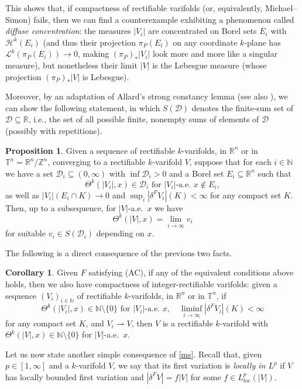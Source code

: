 \documentclass[11pt,a4paper]{amsart}
\newcommand{\N}{\mathbb{N}}
\newcommand{\Z}{\mathbb{Z}}
\newcommand{\R}{\mathbb{R}}
\newcommand{\nin}{\not\in}
\theoremstyle{definition}
\newtheorem{corollary}[definition]{Corollary}
\newtheorem{proposition}[definition]{Proposition}
\newcommand{\weakto}{\rightharpoonup}
\begin{document}
This shows that, if compactness of rectifiable varifolds (or, equivalently, Michael--Simon) fails,
then we can find a counterexample exhibiting a phenomenon called \emph{diffuse concentration}:
the measures $|V_i|$ are concentrated on Borel sets $E_i$ with $\mathcal{H}^k(E_i)$
(and thus their projection $\pi_P(E_i)$ on any coordinate $k$-plane has $\mathcal{L}^k(\pi_P(E_i))\to0$,
making $(\pi_P)_*|V_i|$ look more and more like a singular measure), but nonetheless
their limit $|V|$ is the Lebesgue measure (whose projection $(\pi_P)_*|V|$ is Lebesgue).


Moreover, by an adaptation of Allard's strong constancy lemma \cite[p.\ 3]{All.const} (see also \cite{DDG,DR}), we can show the following statement, in which $S(\mathcal{D})$ denotes the finite-sum set of $\mathcal{D}\subseteq\R$, i.e., the set of all possible finite, nonempty sums of elements of $\mathcal{D}$ (possibly with repetitions).

\begin{proposition}\label{sumset}
    Given a sequence of rectifiable $k$-varifolds, in $\R^n$ or in $\mathbb{T}^n=\R^n/\Z^n$,
    converging to a rectifiable $k$-varifold $V$, suppose that for each $i\in\N$ we have a set $\mathcal{D}_i\subseteq(0,\infty)$ with $\inf\mathcal{D}_i>0$ and a Borel set $E_i\subseteq\R^n$ such that
    $$\Theta^k(|V_i|,x)\in \mathcal{D}_i\text{ for $|V_i|$-a.e.\ $x\nin E_i$},$$
    as well as $|V_i|(E_i\cap K)\to0$ and $\sup_i|\delta^FV_i|(K)<\infty$
    for any compact set $K$. Then, up to a subsequence, for $|V|$-a.e.\ $x$ we have
    $$\Theta^k(|V|,x)=\lim_{i\to\infty}v_i$$
    for suitable $v_i\in S(\mathcal{D}_i)$ depending on $x$.
\end{proposition}

The following is a direct consequence of the previous two facts.

\begin{corollary}\label{cpt.int}
    Given $F$ satisfying (AC),
    if any of the equivalent conditions above holds, then we also have compactness of integer-rectifiable varifolds:
    given a sequence $(V_i)_{i\in\N}$ of rectifiable $k$-varifolds, in $\R^n$ or in $\mathbb{T}^n$, if
    $$\Theta^k(|V_i|,x)\in\N\setminus\{0\}\text{ for $|V_i|$-a.e.\ $x$},\quad\liminf_{i\to\infty}|\delta^FV_i|(K)<\infty$$
    for any compact set $K$, and $V_i\weakto V$, then $V$ is a rectifiable $k$-varifold
    with $\Theta^k(|V|,x)\in\N\setminus\{0\}$ for $|V|$-a.e.\ $x$.
\end{corollary}

Let us now state another simple consequence of \cref{ms}. Recall that, given $p\in[1,\infty]$ and a $k$-varifold $V$, we say that its first variation is \emph{locally in $L^p$} if $V$ has locally bounded first variation and $|\delta^FV|=f|V|$ for some $f\in L^p_{loc}(|V|)$.
\end{document}
